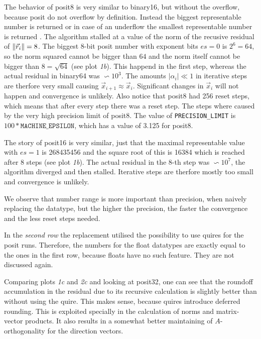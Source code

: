\documentclass{article}
\theoremstyle{plain} %
\theoremstyle{remark} %
\def\code#1{\texttt{#1}}
\numberwithin{equation}{section}
\begin{document}
The behavior of \gls{posit8} is very similar to \gls{binary16}, but without the overflow, because posit do not overflow by definition. Instead the biggest representable number is returned or in case of an underflow the smallest representable number is returned \cite{posit2018standard}. The algorithm stalled at a value of the norm of the recusive residual of $\norm{\vec{r}_i} = 8$. The biggest \num{8}-bit posit number with exponent bits $es=0$ is $2^6 = 64$, so the norm squared cannot be bigger than $64$ and the norm itself cannot be bigger than $8 = \sqrt{64}$ (see plot \textit{1b}). This happend in the first step, whereas the actual residual in \gls{binary64} was $\backsim 10^3$. The amounts $|\alpha_i| \ll 1$ in iterative steps are therfore very small causing $\vec{x}_{i+1} \approx \vec{x}_i$. Significant changes in $\vec{x}_i$ will not happen and convergence is unlikely. Also notice that \gls{posit8} had \num{256} reset steps, which means that after every step there was a reset step. The steps where caused by the very high precision limit of \gls{posit8}. The value of \code{PRECISION\_LIMIT} is $100*\code{MACHINE\_EPSILON}$, which has a value of \num{3.125} for \gls{posit8}.

The story of \gls{posit16} is very similar, just that the maximal representable value with $es=1$ is \num{268435456} and the square root of this is \num{16384} which is reached after $8$ steps (see plot \textit{1b}). The actual residual in the $8$-th step was $\backsim 10^7$, the algorithm diverged and then stalled. Iterative steps are therfore mostly too small and convergence is unlikely.

We observe that number range is more important than precision, when naively replacing the datatype, but the higher the precision, the faster the convergence and the less reset steps needed.

In the \textit{second row} the replacement utilised the possibility to use \glspl{quire} for the posit runs. Therefore, the numbers for the float datatypes are exactly equal to the ones in the first row, because floats have no such feature. They are not discussed again.

Comparing plots \textit{1c} and \textit{2c} and looking at \gls{posit32}, one can see that the roundoff accumulation in the residual due to its recursive calculation is slightly better than without using the \gls{quire}. This makes sense, because \glspl{quire} introduce deferred rounding. This is exploited specially in the calculation of norms and matrix-vector products. It also results in a somewhat better maintaining of $A$-orthogonality for the direction vectors.
\end{document}
